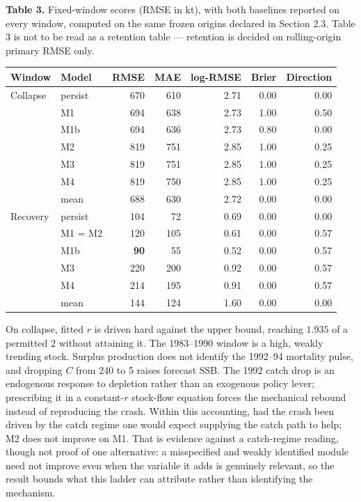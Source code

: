 \documentclass[11pt]{article}
\begin{document}
\textbf{Table 3.} Fixed-window scores (RMSE in kt), with both baselines
reported on every window, computed on the same frozen origins declared
in Section 2.3. Table 3 is not to be read as a retention table ---
retention is decided on rolling-origin primary RMSE only.

\begin{longtable}[]{@{}llrrrrr@{}}
\toprule\noalign{}
Window & Model & RMSE & MAE & log-RMSE & Brier & Direction \\
\midrule\noalign{}
\endhead
\bottomrule\noalign{}
\endlastfoot
Collapse & persist & 670 & 610 & 2.71 & 0.00 & 0.00 \\
& M1 & 694 & 638 & 2.73 & 1.00 & 0.50 \\
& M1b & 694 & 636 & 2.73 & 0.80 & 0.00 \\
& M2 & 819 & 751 & 2.85 & 1.00 & 0.25 \\
& M3 & 819 & 751 & 2.85 & 1.00 & 0.25 \\
& M4 & 819 & 750 & 2.85 & 1.00 & 0.25 \\
& mean & 688 & 630 & 2.72 & 0.00 & 0.00 \\
Recovery & persist & 104 & 72 & 0.69 & 0.00 & 0.00 \\
& M1 = M2 & 120 & 105 & 0.61 & 0.00 & 0.57 \\
& M1b & \textbf{90} & 55 & 0.52 & 0.00 & 0.57 \\
& M3 & 220 & 200 & 0.92 & 0.00 & 0.57 \\
& M4 & 214 & 195 & 0.91 & 0.00 & 0.57 \\
& mean & 144 & 124 & 1.60 & 0.00 & 0.00 \\
\end{longtable}

On collapse, fitted \(r\) is driven hard against the upper bound,
reaching \(1.935\) of a permitted \(2\) without attaining it.
The 1983--1990 window is a high, weakly trending stock. Surplus
production does not identify the 1992--94 mortality pulse, and dropping
\(C\) from 240 to 5 raises forecast SSB. The 1992 catch drop is an
endogenous response to depletion rather than an exogenous policy lever;
prescribing it in a constant-\(r\) stock-flow equation forces the
mechanical rebound instead of reproducing the crash. Within this
accounting, had the crash been driven by the catch regime one would
expect supplying the catch path to help; M2 does not improve on M1. That
is evidence against a catch-regime reading, though not proof of one
alternative: a misspecified and weakly identified module need not
improve even when the variable it adds is genuinely relevant, so the
result bounds what this ladder can attribute rather than identifying the
mechanism.
\end{document}
